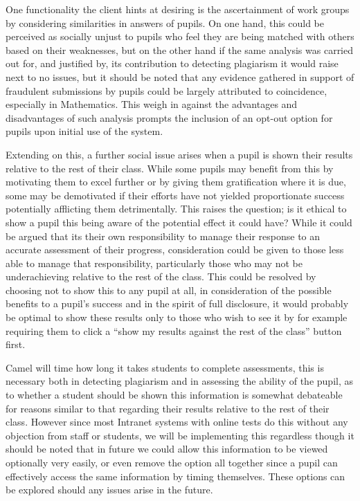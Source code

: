     One functionality the client hints at desiring is the ascertainment of work groups by considering similarities in answers of pupils. On one hand, this could be perceived as socially unjust to pupils who feel they are being matched with others based on their weaknesses, but on the other hand if the same analysis was carried out for, and justified by, its contribution to detecting plagiarism it would raise next to no issues, but it should be noted that any evidence gathered in support of fraudulent submissions by pupils could be largely attributed to coincidence, especially in Mathematics. This weigh in against the advantages and disadvantages of such analysis prompts the inclusion of an opt-out option for pupils upon initial use of the system.

    Extending on this, a further social issue arises when a pupil is shown their results relative to the rest of their class. While some pupils may benefit from this by motivating them to excel further or by giving them gratification where it is due, some may be demotivated if their efforts have not yielded proportionate success potentially afflicting them detrimentally. This raises the question; is it ethical to show a pupil this being aware of the potential effect it could have? While it could be argued that its their own responsibility to manage their response to an accurate assessment of their progress, consideration could be given to those less able to manage that responsibility, particularly those who may not be underachieving relative to the rest of the class. This could be resolved by choosing not to show this to any pupil at all, in consideration of the possible benefits to a pupil’s success and in the spirit of full disclosure, it would probably be optimal to show these results only to those who wish to see it by for example requiring them to click a “show my results against the rest of the class” button first.

    Camel will time how long it takes students to complete assessments, this is necessary both in detecting plagiarism and in assessing the ability of the pupil, as to whether a student should be shown this information is somewhat debateable for reasons similar to that regarding their results relative to the rest of their class. However since most Intranet systems with online tests do this without any objection from staff or students, we will be implementing this regardless though it should be noted that in future we could allow this information to be viewed optionally very easily, or even remove the option all together since a pupil can effectively access the same information by timing themselves. These options can be explored should any issues arise in the future.

